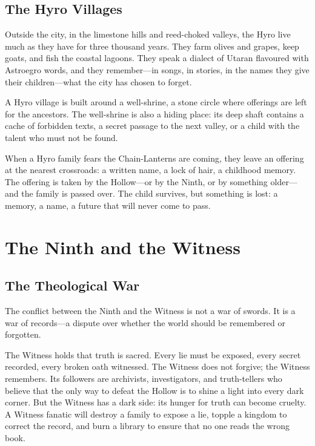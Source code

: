 \documentclass[10pt,twocolumn]{book}
\begin{document}
\section{The Hyro Villages}

Outside the city, in the limestone hills and reed-choked valleys, the Hyro live much as they have for three thousand years. They farm olives and grapes, keep goats, and fish the coastal lagoons. They speak a dialect of Utaran flavoured with Astroegro words, and they remember---in songs, in stories, in the names they give their children---what the city has chosen to forget.

A Hyro village is built around a well-shrine, a stone circle where offerings are left for the ancestors. The well-shrine is also a hiding place: its deep shaft contains a cache of forbidden texts, a secret passage to the next valley, or a child with the talent who must not be found.

When a Hyro family fears the Chain-Lanterns are coming, they leave an offering at the nearest crossroads: a written name, a lock of hair, a childhood memory. The offering is taken by the Hollow---or by the Ninth, or by something older---and the family is passed over. The child survives, but something is lost: a memory, a name, a future that will never come to pass.

\chapter{The Ninth and the Witness}

\section{The Theological War}

The conflict between the Ninth and the Witness is not a war of swords. It is a war of records---a dispute over whether the world should be remembered or forgotten.

The Witness holds that truth is sacred. Every lie must be exposed, every secret recorded, every broken oath witnessed. The Witness does not forgive; the Witness remembers. Its followers are archivists, investigators, and truth-tellers who believe that the only way to defeat the Hollow is to shine a light into every dark corner. But the Witness has a dark side: its hunger for truth can become cruelty. A Witness fanatic will destroy a family to expose a lie, topple a kingdom to correct the record, and burn a library to ensure that no one reads the wrong book.
\end{document}

